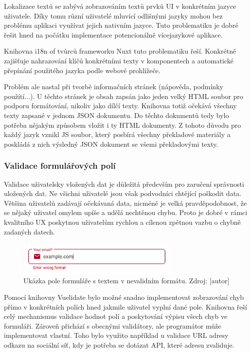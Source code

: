 		Lokalizace textů se zabývá zobrazováním textů prvků \ac{UI} v konkrétním jazyce uživatele.
		Díky tomu různí uživatelé mluvící odlišnými jazyky mohou bez problému aplikaci využívat jejich nativním jazyce.
		Tuto problematiku je dobré řešit hned na počátku implementace potencionálně vícejazykové aplikace.

		Knihovna i18n of tvůrců frameworku Nuxt tuto problematiku řeší.
		Konkrétně zajišťuje nahrazování klíčů konkrétními texty v komponentech a automatické přepínání použitého jazyka
		podle webové prohlížeče.

		Problém ale nastal při tvorbě informačních stránek (nápověda, podmínky použítí...).
		U těchto stránek je obsah zapsán jako jeden velký \ac{HTML} soubor pro podporu formátování, nikoliv
		jako dílčí texty.
		Knihovna totiž očekává všechny texty zapsané v jednom \ac{JSON} dokumentu.
		Do těchto dokumentů tedy bylo potřeba nějakým způsobem vložit i ty \ac{HTML} dokumenty.
		Z tohoto důvodu pro každý jazyk vznikl \ac{JS} soubor, který posbírá všechny překladové materiály a poskládá z nich
		výsledný \ac{JSON} dokument se všemi překladovými texty.

		\subsubsection{Validace formulářových polí}

		Validace uživatelsky vložených dat je důležitá především pro zaručení správnosti uložených dat.
		Ne všichni uživatelé jsou však podvodníci chtějící poškodit data.
		Většina uživatelů zadávají očekávaná data, nicméně je velká pravděpodobnost, že se nějaký uživatel omylem upíše
		a udělá nechtěnou chybu.
		Proto je dobré v rámci kvalitního \ac{UX} poskytnou uživatelům rychlou a cílenou zpětnou vazbu o chybně zadaných
		datech.

		\begin{figure}[H]
			\centering
			\includegraphics[width=8cm]{obrazky/nevalidni_pole_formulare}\hfill
			\caption{Ukázka pole formuláře s textem v nevalidním formátu. Zdroj: [autor]}
		\end{figure}

		Pomocí knihovny Vuelidate bylo možné snadno implementovat zobrazování chyb přímo v konkrétních polích
		hned jakmile uživatel vyplní dané pole.
		Knihovna řeší celý mechanismus validace hodnot polí a poskytování výpisu všech chyb ve formuláři.
		Zároveň přichází s obecnými validátory, ale programátor může implementovat vlastní.
		Toho bylo využito například u validace \ac{URL} adresy odkazu na sociální síť, kdy je potřeba se dotázat \ac{API},
		které adresu zvaliduje.

